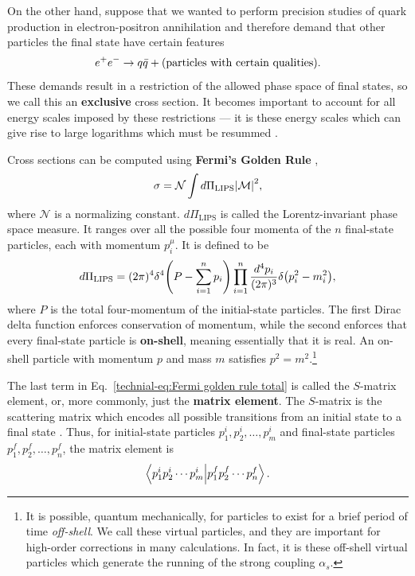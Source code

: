 \documentclass[../thesis.tex]{subfiles}
\providecommand{\LIPS}{\mathrm{LIPS}}
\providecommand{\cN}{\mathcal{N}}
\providecommand{\cM}{\mathcal{M}}
\begin{document}
	On the other hand, suppose that we wanted to perform precision studies of quark production in electron-positron annihilation and therefore demand that other particles the final state have certain features
	\begin{equation}
		e^+ e^- \to q \bar q + \qty(\text{particles with certain qualities}).
	\end{equation}
	These demands result in a restriction of the allowed phase space of final states, so we call this an \textbf{exclusive} cross section. It becomes important to account for all energy scales imposed by these restrictions --- it is these energy scales which can give rise to large logarithms which must be resummed \cite{larkoski_elementary_2019-1}. 

	Cross sections can be computed using \textbf{Fermi's Golden Rule} \cite{larkoski_elementary_2019-1,schwartz_quantum_2014},
	\begin{equation}\label{technial-eq:Fermi golden rule total}
		\sigma = \cN \int d\Pi_\LIPS \abs{\cM}^2,
	\end{equation}
	where $\cN$ is a normalizing constant. $d\Pi_\LIPS$ is called the Lorentz-invariant phase space measure. It ranges over all the possible four momenta of the $n$ final-state particles, each with momentum $p_i^\mu$. It is defined to be
	\begin{equation}
		d\Pi_\LIPS = (2\pi)^4 \delta^4\qty(P - \sum_{i = 1}^n p_i) \prod_{i = 1}^n \frac{d^4 p_i}{(2\pi)^3} \delta\qty(p_i^2 - m_i^2),
	\end{equation}
	where $P$ is the total four-momentum of the initial-state particles. The first Dirac delta function enforces conservation of momentum, while the second enforces that every final-state particle is \textbf{on-shell}, meaning essentially that it is real. An on-shell particle with momentum $p$ and mass $m$ satisfies $p^2 = m^2$.\footnote{It is possible, quantum mechanically, for particles to exist for a brief period of time \textit{off-shell}. We call these virtual particles, and they are important for high-order corrections in many calculations. In fact, it is these off-shell virtual particles which generate the running of the strong coupling $\alpha_s$.}

	The last term in Eq.~\ref{technial-eq:Fermi golden rule total} is called the $S$-matrix element, or, more commonly, just the \textbf{matrix element}. The $S$-matrix is the scattering matrix which encodes all possible transitions from an initial state to a final state \cite{larkoski_elementary_2019-1}. Thus, for initial-state particles $p_1^i, p_2^i, \dots, p_m^i$ and final-state particles $p_1^f, p_2^f, \dots, p_n^f$, the matrix element is
	\begin{equation}
		\braket{p_1^i p_2^i \cdots p_m^i}{p_1^f p_2^f \cdots p_n^f}.
	\end{equation}
\end{document}
